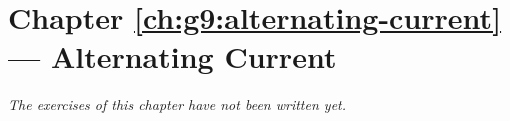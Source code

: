 \section*{Chapter \ref{ch:g9:alternating-current} --- Alternating Current}


\emph{The exercises of this chapter have not been written yet.}
